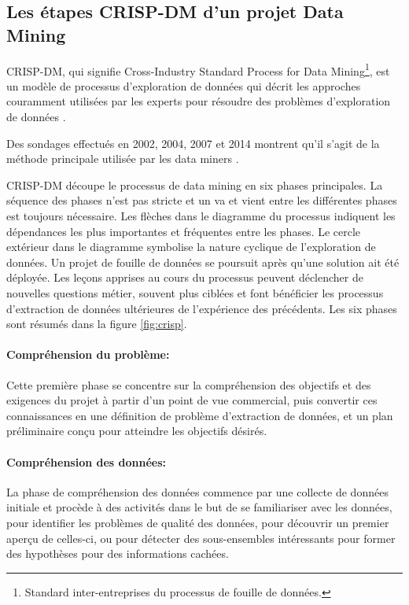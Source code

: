 	\subsection{Les étapes CRISP-DM d'un projet Data Mining}
	CRISP-DM, qui signifie Cross-Industry Standard Process for Data Mining\footnote{Standard inter-entreprises du processus de fouille de données.}, est un modèle de processus d'exploration de données qui décrit les approches couramment utilisées par les experts pour résoudre des problèmes d'exploration de données \cite{CRISP-DM}.\par 
	Des sondages effectués en 2002, 2004, 2007 et 2014 montrent qu'il s'agit de la méthode principale utilisée par les data miners \cite{KDN}.\par
	
	CRISP-DM découpe le processus de data mining en six phases principales. La séquence des phases n'est pas stricte et un va et vient entre les différentes phases est toujours nécessaire. Les flèches dans le diagramme du processus indiquent les dépendances les plus importantes et fréquentes entre les phases. Le cercle extérieur dans le diagramme symbolise la nature cyclique de l'exploration de données. Un projet de fouille de données se poursuit après qu'une solution ait été déployée. Les leçons apprises au cours du processus peuvent déclencher de nouvelles questions métier, souvent plus ciblées et font bénéficier les processus d'extraction de données ultérieures de l'expérience des précédents. Les six phases sont résumés dans la figure \ref{fig:crisp}.
	\newpage
	\paragraph{Compréhension du problème:}
	Cette première phase se concentre sur la compréhension des objectifs et des exigences du projet à partir d'un point de vue commercial, puis convertir ces connaissances en une définition de problème d'extraction de données, et un plan préliminaire conçu pour atteindre les objectifs désirés.
	\paragraph{Compréhension des données:}
	La phase de compréhension des données commence par une collecte de données initiale et procède à des activités dans le but de se familiariser avec les données, pour identifier les problèmes de qualité des données, pour découvrir un premier aperçu de celles-ci, ou pour détecter des sous-ensembles intéressants pour former des hypothèses pour des informations cachées.
